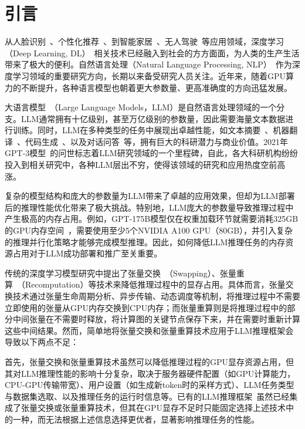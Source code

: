 \section{引言}

从人脸识别~\cite{Face-Recognition}、个性化推荐~\cite{Personal-Recommendation}、到智能家居~\cite{Smart-Home}、无人驾驶~\cite{Self-Driving}等应用领域，深度学习（Deep Learning, DL）~\cite{Deep-Learning}相关技术已经融入到社会的方方面面，为人类的生产生活带来了极大的便利。自然语言处理（Natural Language Processing, NLP）~\cite{NLP}作为深度学习领域的重要研究方向，长期以来备受研究人员关注。近年来，随着GPU算力的不断提升，各种语言模型也朝着更大参数量、更高准确度的方向迅猛发展。

大语言模型~\cite{LLM}（Large Language Models，LLM）是自然语言处理领域的一个分支。LLM通常拥有十亿级别，甚至万亿级别的参数量，因此需要海量文本数据进行训练。同时，LLM在多种类型的任务中展现出卓越性能，如文本摘要~\cite{Text-Summarization}、机器翻译~\cite{Machine-Translation}、代码生成~\cite{Code-Generation}、以及对话问答~\cite{Question-Answer}等，拥有巨大的科研潜力与商业价值。2021年GPT-3模型~\cite{Text-Summarization, GPT3}的问世标志着LLM研究领域的一个里程碑，自此，各大科研机构纷纷投入到相关研究中，各种LLM层出不穷，使得该领域的研究和应用热度空前高涨。

复杂的模型结构和庞大的参数量为LLM带来了卓越的应用效果，但却为LLM部署后的推理性能优化带来了极大挑战。特别地，LLM庞大的参数量导致推理过程中产生极高的内存占用。例如，GPT-175B模型仅在权重加载环节就需要消耗325GB的GPU内存空间~\cite{GPT-175B资源消耗}，需要使用至少5个NVIDIA A100 GPU（80GB），并引入复杂的推理并行化策略才能够完成模型推理。因此，如何降低LLM推理任务的内存资源占用对于LLM成功部署和推广至关重要。

传统的深度学习模型研究中提出了张量交换~\cite{Swapping}（Swapping）、张量重算~\cite{Recomputation}（Recomputation）等技术来降低推理过程中的显存占用。具体而言，张量交换技术通过张量生命周期分析、异步传输、动态调度等机制，将推理过程中不需要立即使用的张量从GPU内存交换到CPU内存；而张量重算则是将推理过程中的部分中间张量在不需要时释放，将计算图的关键节点保存下来，并在需要时重新计算这些中间结果。然而，简单地将张量交换和张量重算技术应用于LLM推理框架会导致以下两点不足：

首先，张量交换和张量重算技术虽然可以降低推理过程的GPU显存资源占用，但其对LLM推理性能的影响十分复杂，取决于服务器硬件配置（如GPU计算能力，CPU-GPU传输带宽）、用户设置（如生成新token时的采样方式）、LLM任务类型与数据集选取、以及推理任务的运行时信息等。已有的LLM推理框架~\cite{Swapping, vLLM, ORCA}虽然已经集成了张量交换或张量重算技术，但其在GPU显存不足时只能固定选择上述技术中的一种，而无法根据上述信息选择更优者，显著影响推理任务的性能。

